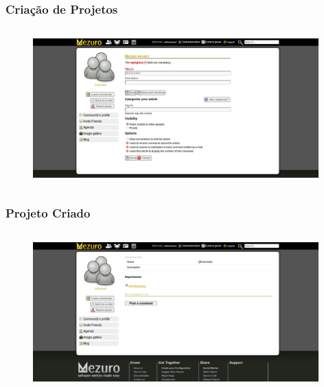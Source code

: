 \documentclass{beamer}
\begin{document}
    \begin{frame}
      \frametitle{Criação de Projetos}
      \framesubtitle{}

      \begin{figure}
        \begin{center}
          \includegraphics[width=11cm, height=6cm]{images/05-project-creation.png}
          \label{fig:project-creation}
        \end{center}
      \end{figure}
    \end{frame}

    \begin{frame}
      \frametitle{Projeto Criado}
      \framesubtitle{}

      \begin{figure}
        \begin{center}
          \includegraphics[width=11cm, height=6cm]{images/06-project-created.png}
          \label{fig:project-created}
        \end{center}
      \end{figure}
    \end{frame}
\end{document}
